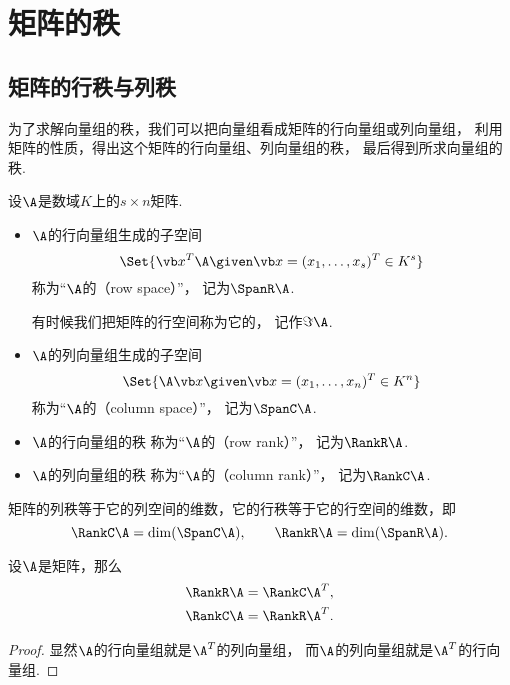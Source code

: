 \section{矩阵的秩}
\subsection{矩阵的行秩与列秩}
为了求解向量组的秩，我们可以把向量组看成矩阵的行向量组或列向量组，
利用矩阵的性质，得出这个矩阵的行向量组、列向量组的秩，
最后得到所求向量组的秩.

\begin{definition}\label{definition:线性方程组.行秩与列秩的定义}
设\(\A\)是数域\(K\)上的\(s \times n\)矩阵.
\begin{itemize}
	\item \(\A\)的行向量组生成的子空间\[
		\Set{
			\x^T\A \given \x=(x_1,\dotsc,x_s)^T \in K^s
		}
	\]
	称为“\(\A\)的（row space）”，
	记为\(\SpanR\A\).

	有时候我们把矩阵的行空间称为它的，
	记作\(\Im\A\).

	\item \(\A\)的列向量组生成的子空间\[
		\Set{
			\A\x \given \x=(x_1,\dotsc,x_n)^T \in K^n
		}
	\]
	称为“\(\A\)的（column space）”，
	记为\(\SpanC\A\).
	\item \(\A\)的行向量组的秩
	称为“\(\A\)的（row rank）”，
	记为\(\RankR\A\).
	\item \(\A\)的列向量组的秩
	称为“\(\A\)的（column rank）”，
	记为\(\RankC\A\).
\end{itemize}
\end{definition}

矩阵的列秩等于它的列空间的维数，它的行秩等于它的行空间的维数，即\[
	\RankC\A=\dim(\SpanC\A), \qquad
	\RankR\A=\dim(\SpanR\A).
\]

\begin{proposition}\label{theorem:向量空间.矩阵的行秩与列秩分别等于它的转置矩阵的列秩与行秩}
设\(\A\)是矩阵，那么\begin{gather}
	\RankR\A=\RankC\A^T, \\
	\RankC\A=\RankR\A^T.
\end{gather}
\begin{proof}
显然\(\A\)的行向量组就是\(\A^T\)的列向量组，
而\(\A\)的列向量组就是\(\A^T\)的行向量组.
\end{proof}
\end{proposition}

